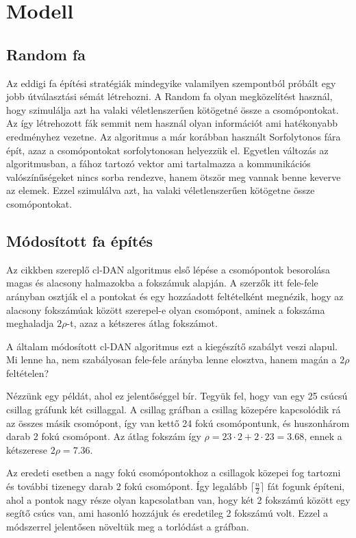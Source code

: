 \documentclass[12pt]{report}
\begin{document}
\chapter{Modell}

\section{Random fa}

Az eddigi fa építési stratégiák mindegyike valamilyen szempontból próbált egy jobb útválasztási sémát létrehozni.
A Random fa olyan megközelítést használ, hogy szimulálja azt ha valaki véletlenszerűen kötögetné össze a csomópontokat.
Az így létrehozott fák semmit nem használ olyan információt ami hatékonyabb eredményhez vezetne.
Az algoritmus a már korábban használt Sorfolytonos fára épít, azaz a csomópontokat sorfolytonosan helyezzük el.
Egyetlen változás az algoritmusban, a fához tartozó vektor ami tartalmazza a kommunikációs valószínűségeket nincs sorba rendezve, hanem ötször meg vannak benne keverve az elemek. 
Ezzel szimulálva azt, ha valaki véletlenszerűen kötögetne össze csomópontokat.


\section{Módosított fa építés}


Az cikkben szereplő cl-DAN algoritmus első lépése a csomópontok besorolása magas és alacsony halmazokba a fokszámuk alapján. 
A szerzők itt fele-fele arányban osztják el a pontokat és egy hozzáadott feltételként megnézik, hogy az alacsony fokszámúak között szerepel-e olyan csomópont, aminek a fokszáma meghaladja \(2\rho\)-t, azaz a kétszeres átlag fokszámot.

A általam módosított cl-DAN algoritmus ezt a kiegészítő szabályt veszi alapul.
Mi lenne ha, nem szabályosan fele-fele arányba lenne elosztva, hanem magán a \(2\rho\) feltételen?

Nézzünk egy példát, ahol ez jelentőséggel bír.
Tegyük fel, hogy van egy 25 csúcsú csillag gráfunk két csillaggal.
A csillag gráfban a csillag közepére kapcsolódik rá az összes másik csomópont, így van kettő 24 fokú csomópontunk, és huszonhárom darab 2 fokú csomópont. 
Az átlag fokszám így \(\rho=23\cdot2+2\cdot23=3.68\), ennek a kétszerese \(2\rho=7.36\).

Az eredeti esetben a nagy fokú csomópontokhoz a csillagok közepei fog tartozni és további tizenegy darab 2 fokú csomópont. 
Így legalább $\lceil\frac{n}{2}\rceil$ fát fogunk építeni, ahol a pontok nagy része olyan kapcsolatban van, hogy két 2 fokszámú között egy segítő csúcs van, ami hasonló hozzájuk és eredetileg 2 fokszámú volt. 
Ezzel a módszerrel jelentősen növeltük meg a torlódást a gráfban.
\end{document}
